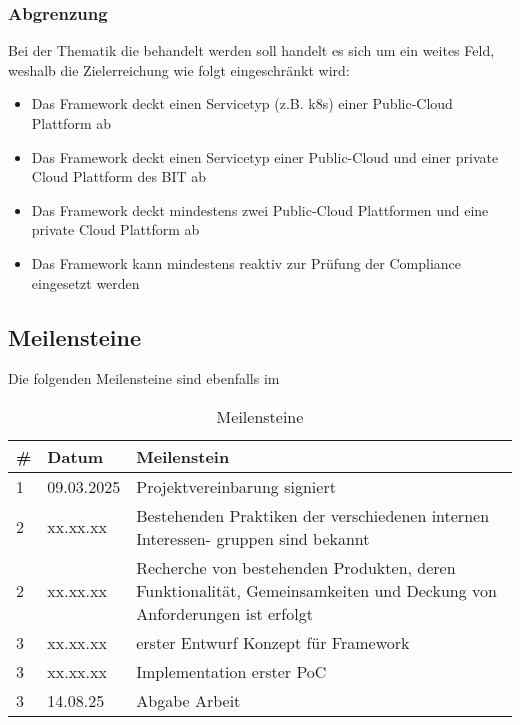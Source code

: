 \subsubsection{Abgrenzung}

Bei der Thematik die behandelt werden soll handelt es sich um ein weites Feld, weshalb die Zielerreichung wie folgt eingeschränkt wird:

\begin{itemize}
    \item Das Framework deckt einen Servicetyp (z.B. k8s) einer Public-Cloud Plattform ab
    \item Das Framework deckt einen Servicetyp einer Public-Cloud und einer private Cloud Plattform des BIT ab
    \item Das Framework deckt mindestens zwei Public-Cloud Plattformen und eine private Cloud Plattform ab
    \item Das Framework kann mindestens reaktiv zur Prüfung der Compliance eingesetzt werden
\end{itemize}

\subsection{Meilensteine}

Die folgenden Meilensteine sind ebenfalls im 

\begin{table}[H]
    \centering
    \begin{tabularx}{\textwidth}{|l|l|X|}
        \hline
        \textbf{\#} & \textbf{Datum} & \textbf{Meilenstein} \\
        \hline
        1 & 09.03.2025 & Projektvereinbarung signiert
        \\
        \hline
        2 & xx.xx.xx & Bestehenden Praktiken der verschiedenen internen Interessen-
        gruppen sind bekannt
        \\
        \hline
        2 & xx.xx.xx & Recherche von bestehenden Produkten, deren Funktionalität, Gemeinsamkeiten und Deckung von Anforderungen ist erfolgt
        \\
        \hline
        3 & xx.xx.xx & erster Entwurf Konzept für Framework
        \\
        \hline
        3 & xx.xx.xx & Implementation erster PoC
        \\
        \hline
        3 & 14.08.25 & Abgabe Arbeit
        \\
        \hline
    \end{tabularx}
    \caption{Meilensteine}
    \label{tab:milestones}
\end{table}